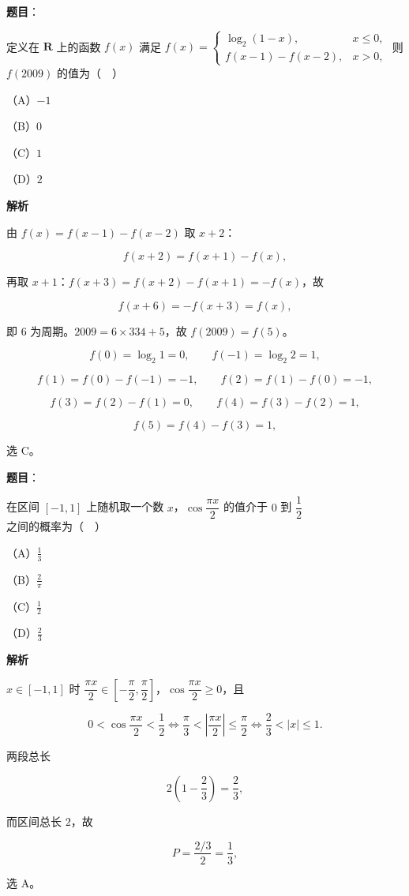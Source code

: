 \begin{answer}

\textbf{题目}：

定义在 $\mathbf R$ 上的函数 $f(x)$ 满足 $f(x)=\begin{cases}\log_2(1-x),&x\leqslant0,\\ f(x-1)-f(x-2),&x>0,\end{cases}$ 则 $f(2009)$ 的值为（　）

（A）$-1$

（B）$0$

（C）$1$

（D）$2$

\textbf{解析}

由 $f(x)=f(x-1)-f(x-2)$ 取 $x+2$：

\nopagebreak[4]
\[f(x+2)=f(x+1)-f(x),\]

再取 $x+1$：$f(x+3)=f(x+2)-f(x+1)=-f(x)$，故

\nopagebreak[4]
\[f(x+6)=-f(x+3)=f(x),\]

即 $6$ 为周期。$2009=6\times334+5$，故 $f(2009)=f(5)$。

\nopagebreak[4]
\[f(0)=\log_2 1=0,\qquad f(-1)=\log_2 2=1,\]

\nopagebreak[4]
\[f(1)=f(0)-f(-1)=-1,\qquad f(2)=f(1)-f(0)=-1,\]

\nopagebreak[4]
\[f(3)=f(2)-f(1)=0,\qquad f(4)=f(3)-f(2)=1,\]

\nopagebreak[4]
\[f(5)=f(4)-f(3)=1,\]

选 C。


\end{answer}
\begin{answer}

\textbf{题目}：

在区间 $[-1,1]$ 上随机取一个数 $x$，$\cos\dfrac{\pi x}{2}$ 的值介于 $0$ 到 $\dfrac12$ 之间的概率为（　）

（A）$\frac13$

（B）$\frac2\pi$

（C）$\frac12$

（D）$\frac23$

\textbf{解析}

$x\in[-1,1]$ 时 $\dfrac{\pi x}{2}\in\left[-\dfrac\pi2,\dfrac\pi2\right]$，$\cos\dfrac{\pi x}{2}\geqslant0$，且

\nopagebreak[4]
\[0<\cos\frac{\pi x}{2}<\frac12\iff \frac\pi3<\left|\frac{\pi x}{2}\right|\leqslant\frac\pi2\iff \frac23<|x|\leqslant1 .\]

两段总长

\nopagebreak[4]
\[2\left(1-\frac23\right)=\frac23,\]

而区间总长 $2$，故

\nopagebreak[4]
\[P=\frac{2/3}{2}=\frac13,\]

选 A。


\end{answer}
